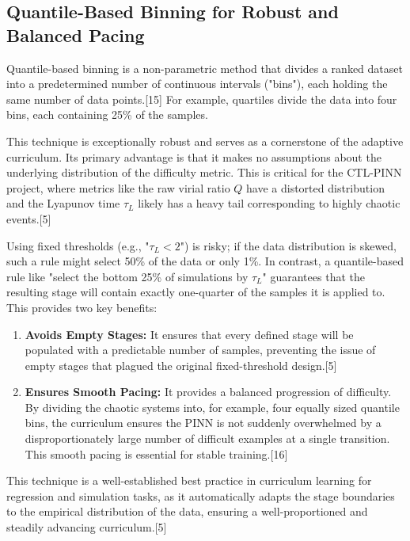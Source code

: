 \subsection{Quantile-Based Binning for Robust and Balanced Pacing}

Quantile-based binning is a non-parametric method that divides a ranked dataset into a predetermined number of continuous intervals ("bins"), each holding the same number of data points.[15] For example, quartiles divide the data into four bins, each containing 25\% of the samples.

This technique is exceptionally robust and serves as a cornerstone of the adaptive curriculum. Its primary advantage is that it makes no assumptions about the underlying distribution of the difficulty metric. This is critical for the CTL-PINN project, where metrics like the raw virial ratio $Q$ have a distorted distribution and the Lyapunov time $\tau_L$ likely has a heavy tail corresponding to highly chaotic events.[5]

Using fixed thresholds (e.g., "$\tau_L < 2$") is risky; if the data distribution is skewed, such a rule might select 50\% of the data or only 1\%. In contrast, a quantile-based rule like "select the bottom 25\% of simulations by $\tau_L$" guarantees that the resulting stage will contain exactly one-quarter of the samples it is applied to. This provides two key benefits:
\begin{enumerate}
    \item \textbf{Avoids Empty Stages:} It ensures that every defined stage will be populated with a predictable number of samples, preventing the issue of empty stages that plagued the original fixed-threshold design.[5]
    \item \textbf{Ensures Smooth Pacing:} It provides a balanced progression of difficulty. By dividing the chaotic systems into, for example, four equally sized quantile bins, the curriculum ensures the PINN is not suddenly overwhelmed by a disproportionately large number of difficult examples at a single transition. This smooth pacing is essential for stable training.[16]
\end{enumerate}
This technique is a well-established best practice in curriculum learning for regression and simulation tasks, as it automatically adapts the stage boundaries to the empirical distribution of the data, ensuring a well-proportioned and steadily advancing curriculum.[5]
